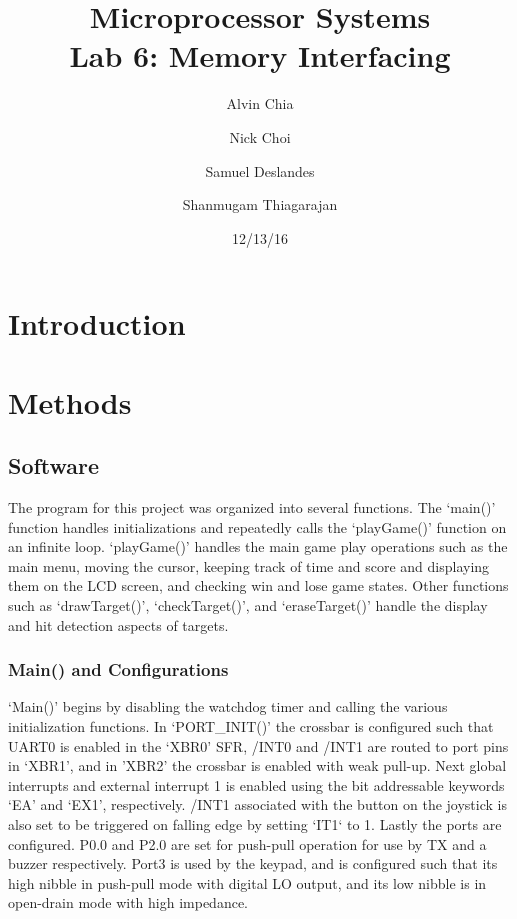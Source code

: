 \documentclass[12pt]{article}
\begin{document}
\title{Microprocessor Systems\\ Lab 6: Memory Interfacing }
\author{Alvin Chia \and Nick Choi \and Samuel Deslandes \and Shanmugam Thiagarajan}
\date{12/13/16}
\maketitle
\pagebreak
\section{Introduction}



\section{Methods}
\subsection{Software}
The program for this project was organized into several functions. The `main()' function handles initializations and repeatedly calls the `playGame()' function on an infinite loop. `playGame()' handles the main game play operations such as the main menu, moving the cursor, keeping track of time and score and displaying them on the LCD screen, and checking win and lose game states. Other functions such as `drawTarget()', `checkTarget()', and `eraseTarget()' handle the display and hit detection aspects of targets. 

\subsubsection{Main() and Configurations}
`Main()' begins by disabling the watchdog timer and calling the various initialization functions. In `PORT\_INIT()' the crossbar is configured such that UART0 is enabled in the `XBR0' SFR, /INT0 and /INT1 are routed to port pins in `XBR1', and in 'XBR2' the crossbar is enabled with weak pull-up. Next global interrupts and external interrupt 1 is enabled using the bit addressable keywords `EA' and `EX1', respectively. /INT1 associated with the button on the joystick is also set to be triggered on falling edge by setting `IT1` to 1. Lastly the ports are configured. P0.0 and P2.0 are set for push-pull operation for use by TX and a buzzer respectively. Port3 is used by the keypad, and is configured such that its high nibble in push-pull mode with digital LO output, and its low nibble is in open-drain mode with high impedance. 
\end{document}
